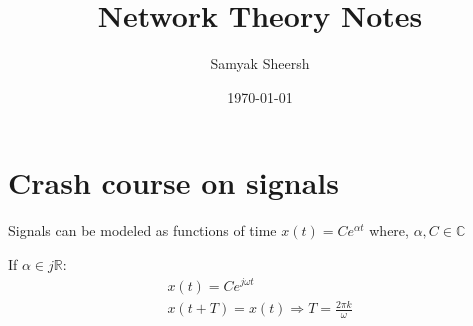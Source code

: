 \documentclass[12pt]{article}
\author{Samyak Sheersh}
\date{\today}
\title{Network Theory Notes}
\begin{document}
\maketitle
\tableofcontents

\section{Crash course on signals}

Signals can be modeled as functions of time $x(t)=Ce^{\alpha t}$ where, $\alpha , C \in \mathbb{C} $

If $\alpha \in j\mathbb{R}$:
\begin{align}
    x(t)=Ce^{j\omega t}\\
    x(t+T)=x(t) \Rightarrow T=\frac{2\pi k}{\omega}
\end{align}
\end{document}
